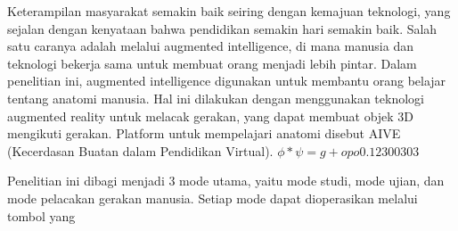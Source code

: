 \begin{abstrak}
    Keterampilan masyarakat semakin baik seiring dengan kemajuan teknologi, yang sejalan dengan kenyataan bahwa pendidikan semakin hari semakin baik. Salah satu caranya adalah melalui augmented intelligence, di mana manusia dan teknologi bekerja sama untuk membuat orang menjadi lebih pintar. Dalam penelitian ini, augmented intelligence digunakan untuk membantu orang belajar tentang anatomi manusia. Hal ini dilakukan dengan menggunakan teknologi augmented reality untuk melacak gerakan, yang dapat membuat objek 3D mengikuti gerakan. Platform untuk mempelajari anatomi disebut AIVE (Kecerdasan Buatan dalam Pendidikan Virtual). $\phi*\psi=g+opo 0.123{00303}$

Penelitian ini dibagi menjadi 3 mode utama, yaitu mode studi, mode ujian, dan mode pelacakan gerakan manusia. Setiap mode dapat dioperasikan melalui tombol yang 
\end{abstrak}